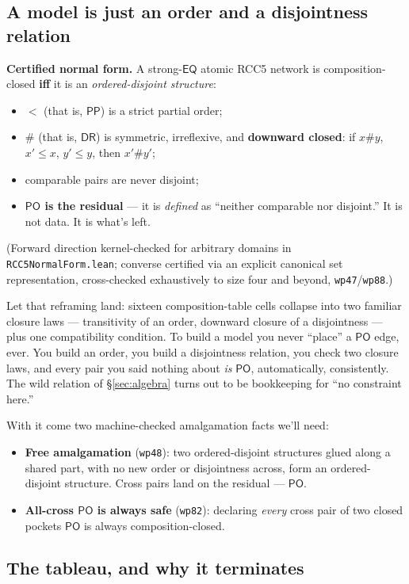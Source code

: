 \documentclass[11pt]{article}
\newcommand{\DR}{\ensuremath{\mathsf{DR}}}
\newcommand{\PO}{\ensuremath{\mathsf{PO}}}
\newcommand{\PP}{\ensuremath{\mathsf{PP}}}
\newcommand{\EQ}{\ensuremath{\mathsf{EQ}}}
\newcommand{\code}[1]{\texttt{#1}}
\begin{document}
\subsection{A model is just an order and a disjointness
relation}\label{ssec:nf}

\textbf{Certified normal form.} A strong-$\EQ$ atomic RCC5 network is
composition-closed \textbf{iff} it is an \emph{ordered-disjoint
structure}:
\begin{itemize}
\item ${<}$ (that is, $\PP$) is a strict partial order;
\item ${\#}$ (that is, $\DR$) is symmetric, irreflexive, and
  \textbf{downward closed}: if $x\#y$, $x'\le x$, $y'\le y$, then
  $x'\#y'$;
\item comparable pairs are never disjoint;
\item \textbf{$\PO$ is the residual} --- it is \emph{defined} as
  ``neither comparable nor disjoint.'' It is not data. It is what's
  left.
\end{itemize}
(Forward direction kernel-checked for arbitrary domains in
\code{RCC5NormalForm.lean}; converse certified via an explicit
canonical set representation, cross-checked exhaustively to size four
and beyond, \code{wp47}/\code{wp88}.)

Let that reframing land: sixteen composition-table cells collapse into
two familiar closure laws --- transitivity of an order, downward
closure of a disjointness --- plus one compatibility condition. To
build a model you never ``place'' a $\PO$ edge, ever. You build an
order, you build a disjointness relation, you check two closure laws,
and every pair you said nothing about \emph{is} $\PO$, automatically,
consistently. The wild relation of \S\ref{sec:algebra} turns out to be
bookkeeping for ``no constraint here.''

With it come two machine-checked amalgamation facts we'll need:
\begin{itemize}
\item \textbf{Free amalgamation} (\code{wp48}): two ordered-disjoint
  structures glued along a shared part, with no new order or
  disjointness across, form an ordered-disjoint structure. Cross pairs
  land on the residual --- $\PO$.
\item \textbf{All-cross $\PO$ is always safe} (\code{wp82}): declaring
  \emph{every} cross pair of two closed pockets $\PO$ is always
  composition-closed.
\end{itemize}

\subsection{The tableau, and why it terminates}\label{ssec:tableau}
\end{document}
